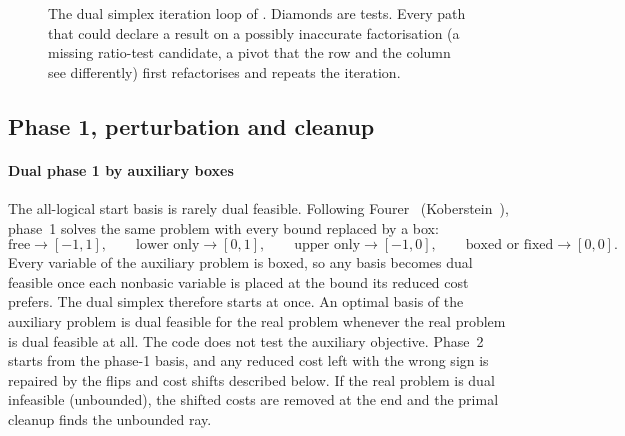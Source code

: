 \begin{figure}[p]
\caption[Dual simplex iteration loop]{The dual simplex iteration loop of .
Diamonds are tests. Every path that could declare a result on a possibly inaccurate
factorisation (a missing ratio-test candidate, a pivot that the row and the column see
differently) first refactorises and repeats the iteration.}
\label{fig:simplex-flow}
\end{figure}

\subsection{Phase 1, perturbation and cleanup}
\paragraph{Dual phase 1 by auxiliary boxes}
The all-logical start basis is rarely dual feasible. Following Fourer~\cite{fourer1994}
(Koberstein~\cite[§4.1.2]{koberstein2005}), phase~1 solves the same problem with every bound replaced by
a box:
\begin{equation}\label{eq:aux}
  \text{free}\to[-1,1],\qquad \text{lower only}\to[0,1],\qquad \text{upper only}\to[-1,0],\qquad
  \text{boxed or fixed}\to[0,0].
\end{equation}
Every variable of the auxiliary problem is boxed, so any basis becomes dual feasible once each
nonbasic variable is placed at the bound its reduced cost prefers. The dual simplex therefore starts
at once. An optimal basis of the auxiliary problem is dual feasible for the real problem whenever the
real problem is dual feasible at all. The code does not test the auxiliary objective. Phase~2
starts from the phase-1 basis, and any reduced cost left with the wrong sign is repaired by the
flips and cost shifts described below. If the real problem is dual infeasible (unbounded), the
shifted costs are removed at the end and the primal cleanup finds the unbounded ray.

